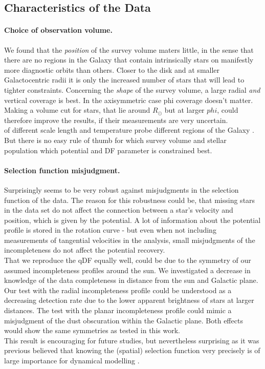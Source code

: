 \subsection{Characteristics of the Data}


\paragraph{Choice of observation volume.} We found that the \emph{position} of the survey volume maters little, in the sense that there are no regions in the Galaxy that contain intrinsically stars on manifestly more diagnostic orbits than others. Closer to the disk and at smaller Galactocentric radii it is only the increased number of stars that will lead to tighter constraints. Concerning the \emph{shape} of the survey volume, a large radial \emph{and} vertical coverage is best. In the axisymmetric case phi coverage doesn't matter. Making a volume cut for stars, that lie around $R_\odot$ but at larger $phi$, could therefore improve the results, if their measurements are very uncertain.
\\\MAPs of different scale length and temperature probe different regions of the Galaxy \citep{bov13}. But there is no easy rule of thumb for which survey volume and stellar population which potential and DF parameter is constrained best.

\paragraph{Selection function misjudgment.} Surprisingly \RM seems to be very robust against misjudgments in the selection function of the data. The reason for this robustness could be, that missing stars in the data set do not affect the connection between a star's velocity and position, which is given by the potential. A lot of information about the potential profile is stored in the rotation curve - but even when not including measurements of tangential velocities in the analysis, small misjudgments of the incompleteness do not affect the potential recovery.
\\That we reproduce the qDF equally well, could be due to the symmetry of our assumed incompleteness profiles around the sun. We investigated a decrease in knowledge of the data completeness in distance from the sun and Galactic plane. Our test with the radial incompleteness profile could be understood as a decreasing detection rate due to the lower apparent brightness of stars at larger distances. The test with the planar incompleteness profile could mimic a misjudgment of the dust obscuration within the Galactic plane. Both effects would show the same symmetries as tested in this work. 
\\This result is encouraging for future studies, but nevertheless surprising as it was previous believed that knowing the (spatial) selection function very precisely is of large importance for dynamical modelling \citep{rix13}.

